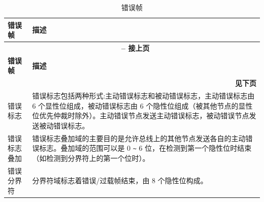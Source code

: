 \begin{longtable}[c]{|p{2.5cm}|p{13cm}|} 
    
  \caption{错误帧}
  \label{tab:twai-error-frame} 
  \\\hline
  \rowcolor{lightgray}
  \textbf{错误帧} & \textbf{描述}
  \\\hline
  \endfirsthead
  
  \multicolumn{2}{c}{\bfseries \tablename\ \thetable{} -- 接上页}\\  \hline
  
  \rowcolor{lightgray}
    \textbf{错误帧} & \textbf{描述}
  \\\hline
  \endhead
  
  \multicolumn{2}{r}{\textbf{见下页}} \\
  \endfoot
  \endlastfoot
  

    错误标志 & 错误标志包括两种形式:主动错误标志和被动错误标志，主动错误标志由 6 个显性位组成，被动错误标志由 6 个隐性位组成（被其他节点的显性位优先仲裁时除外）。主动错误节点发送主动错误标志，被动错误节点发送被动错误标志。
          \\\hline
    错误标志叠加 & 错误标志叠加域的主要目的是允许总线上的其他节点发送各自的主动错误标志。叠加域的范围可以是 0 \verb+~+ 6 位，在检测到第一个隐性位时结束（如检测到分界符上的第一个位时）。                               
           \\\hline
    错误分界符 & 分界符域标志着错误/过载帧结束，由 8 个隐性位构成。                                                   \\\hline
\end{longtable}